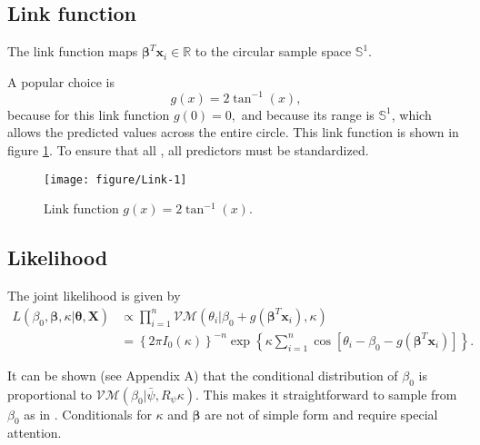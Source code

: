 \documentclass[12pt,a4paper]{article}\usepackage[]{graphicx}\usepackage[]{color}
\newenvironment{knitrout}{}{} %
\begin{document}
\subsection{Link function}

The link function maps $\boldsymbol\beta^T \boldsymbol{x}_i \in \mathbb{R}$ to the circular sample space $\mathbb{S}^1$.

A popular choice is
\begin{equation}
g(x) = 2 \tan^{-1}(x),
\end{equation} because for this link function $g(0) = 0,$ and because its range is $\mathbb{S}^1$, which allows the predicted values across the entire circle. This link function is shown in figure \ref{linkfunc}. To ensure that all , all predictors must be standardized.

\begin{figure}
\begin{knitrout}
\color{fgcolor}

{\centering \texttt{[image: figure/Link-1]} 

}



\end{knitrout}
\caption{Link function $g(x) = 2 \tan^{-1}(x).$}
\label{linkfunc}
\end{figure}

\subsection{Likelihood}

The joint likelihood is given by
\begin{align}
L(\beta_0, \boldsymbol{\beta}, \kappa \vert \boldsymbol{\theta}, \boldsymbol{X}) &\propto  \prod_{i=1}^{n} \mathcal{VM}(\theta_i \vert \beta_0 + g(\boldsymbol\beta^T \boldsymbol{x}_i), \kappa) \\
&=  \left\lbrace 2 \pi I_0(\kappa) \right\rbrace^{-n} \exp \left\lbrace \kappa \sum_{i=1}^{n} \cos \left[ \theta_i - \beta_0 - g(\boldsymbol\beta^T \boldsymbol{x}_i) \right]  \right\rbrace.
\end{align}

It can be shown (see Appendix A) that the conditional distribution of $\beta_0$ is proportional to $\mathcal{VM}(\beta_0 \vert \bar\psi, R_{\psi} \kappa).$ This makes it straightforward to sample from $\beta_0$ as in \citet{fisher1995statistical}. Conditionals for $\kappa$ and $\boldsymbol\beta$ are not of simple form and require special attention.
\end{document}
